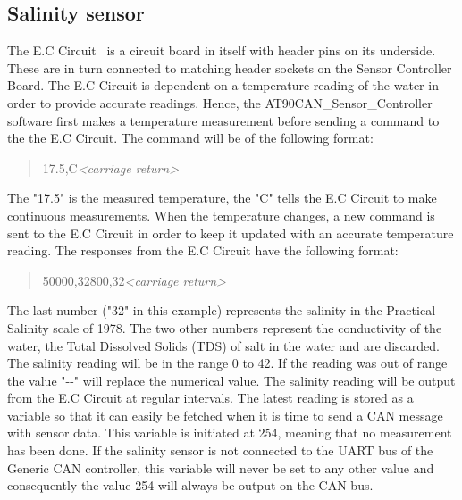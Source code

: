 \subsection{Salinity sensor}
The E.C Circuit~\cite{web:ec_circuit} is a circuit board in itself with header pins on its underside. These are in turn connected to matching header sockets on the Sensor Controller Board. \newline
The E.C Circuit is dependent on a temperature reading of the water in order to provide accurate readings. Hence, the AT90CAN\_Sensor\_Controller software first makes a temperature measurement before sending a command to the the E.C Circuit. The command will be of the following format:

\begin{quote}
17.5,C\emph{<carriage return>}
\end{quote}

The "17.5" is the measured temperature, the "C" tells the E.C Circuit to make continuous measurements. When the temperature changes, a new command is sent to the E.C Circuit in order to keep it updated with an accurate temperature reading. \newline
The responses from the E.C Circuit have the following format:

\begin{quote}
50000,32800,32\emph{<carriage return>}
\end{quote}

The last number ("32" in this example) represents the salinity in the Practical Salinity scale of 1978. The two other numbers represent the conductivity of the water, the Total Dissolved Solids (TDS) of salt in the water and are discarded. The salinity reading will be in the range 0 to 42. If the reading was out of range the value "\--\--" will replace the numerical value. \newline
The salinity reading will be output from the E.C Circuit at regular intervals. The latest reading is stored as a variable so that it can easily be fetched when it is time to send a CAN message with sensor data. This variable is initiated at 254, meaning that no measurement has been done. If the salinity sensor is not connected to the UART bus of the Generic CAN controller, this variable will never be set to any other value and consequently the value 254 will always be output on the CAN bus.
\pagebreak
